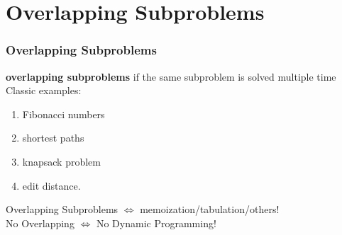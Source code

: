 \documentclass{beamer}
\begin{document}
\section{Overlapping Subproblems}

\begin{frame}
    \frametitle{Overlapping Subproblems}
     {\bf overlapping subproblems} if
    the same subproblem is solved multiple time
    Classic examples: 
    \begin{enumerate}
        \item Fibonacci numbers
        \item shortest paths
        \item knapsack problem
        \item edit distance.
    \end{enumerate}
    \bigskip
    \bigskip

    Overlapping Subproblems $\Leftrightarrow$ memoization/tabulation/others! \\

    No Overlapping $\Leftrightarrow$ No Dynamic Programming!

 
\end{frame}
\end{document}
